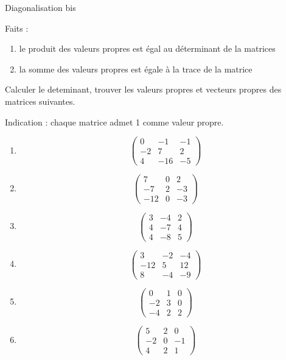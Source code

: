 \documentclass{article}
\begin{document}
\begin{center}
{\Large Diagonalisation bis}
\end{center}


\noindent
Faits :
\begin{enumerate}
	\item le produit des valeurs propres est \'egal au d\'eterminant de la matrices
	\item la somme des valeurs propres est \'egale à la trace de la matrice

\end{enumerate}

\noindent
Calculer le deteminant, trouver les valeurs propres et vecteurs propres des matrices suivantes.

Indication : chaque matrice admet 1 comme valeur propre.

\begin{enumerate}

\item $$\begin{pmatrix}
0 & -1 & -1 \\ 
-2 & 7 & 2 \\ 
4 & -16 & -5
\end{pmatrix}$$

\item $$\begin{pmatrix}
7 & 0 & 2 \\ 
-7 & 2 & -3 \\ 
-12 & 0 & -3
\end{pmatrix}$$

\item $$\begin{pmatrix}
3 & -4 & 2 \\ 
4 & -7 & 4 \\ 
4 & -8 & 5
\end{pmatrix}$$

\item $$\begin{pmatrix}
3 & -2 & -4 \\ 
-12 & 5 & 12 \\ 
8 & -4 & -9
\end{pmatrix}$$

\item $$\begin{pmatrix}
0 & 1 & 0 \\ 
-2 & 3 & 0 \\ 
-4 & 2 & 2
\end{pmatrix}$$

\item $$\begin{pmatrix}
5 & 2 & 0 \\ 
-2 & 0 & -1 \\ 
4 & 2 & 1
\end{pmatrix}$$
\end{enumerate}
\end{document}
